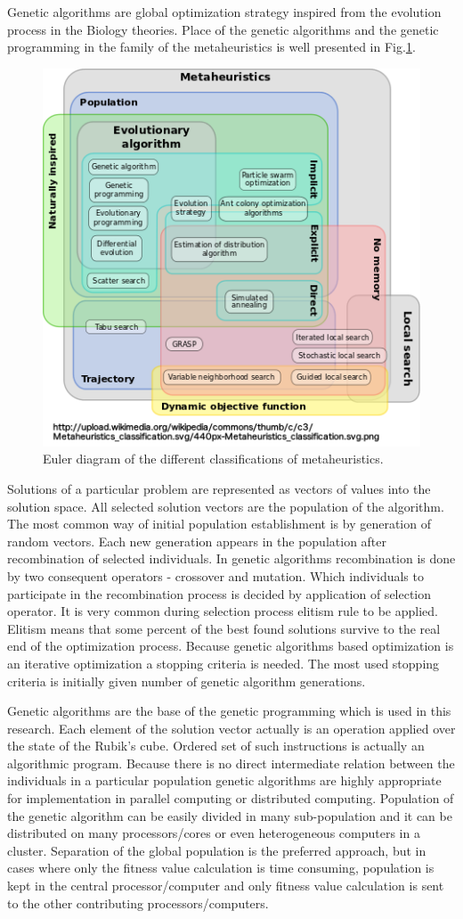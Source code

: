 \documentclass[runningheads]{llncs}
\begin{document}
Genetic algorithms are global optimization strategy inspired from the evolution process in the Biology theories. Place of the genetic algorithms and the genetic programming in the family of the metaheuristics is well presented in Fig.\ref{fig02}.

\begin{figure}
\includegraphics[width=1.0\textwidth,height=0.65\textwidth]{fig02.png}
\centering
\caption{Euler diagram of the different classifications of metaheuristics.} \label{fig02}
\end{figure}

Solutions of a particular problem are represented as vectors of values into the solution space. All selected solution vectors are the population of the algorithm. The most common way of initial population establishment is by generation of random vectors. Each new generation appears in the population after recombination of selected individuals. In genetic algorithms recombination is done by two consequent operators - crossover and mutation. Which individuals to participate in the recombination process is decided by application of selection operator. It is very common during selection process elitism rule to be applied. Elitism means that some percent of the best found solutions survive to the real end of the optimization process. Because genetic algorithms based optimization is an iterative optimization a stopping criteria is needed. The most used stopping criteria is initially given number of genetic algorithm generations. 

Genetic algorithms are the base of the genetic programming which is used in this research. Each element of the solution vector actually is an operation applied over the state of the Rubik's cube. Ordered set of such instructions is actually an algorithmic program. Because there is no direct intermediate relation between the individuals in a particular population genetic algorithms are highly appropriate for implementation in parallel computing or distributed computing. Population of the genetic algorithm can be easily divided in many sub-population and it can be distributed on many processors/cores or even heterogeneous computers in a cluster. Separation of the global population is the preferred approach, but in cases where only the fitness value calculation is time consuming, population is kept in the central processor/computer and only fitness value calculation is sent to the other contributing processors/computers. 
\end{document}
